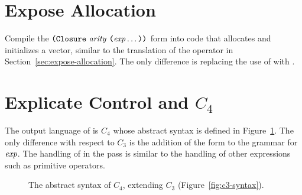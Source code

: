 \documentclass[11pt]{book}
\newcommand{\gray}[1]{{\color{gray} #1}}
\begin{document}
\section{Expose Allocation}
\label{sec:expose-allocation-r5}

Compile the $\texttt{(}\texttt{Closure}~\mathit{arity}~\texttt{(}\mathit{exp}\ldots\texttt{)}\texttt{)}$ form into code
that allocates and initializes a vector, similar to the translation of
the  operator in Section~\ref{sec:expose-allocation}.
The only difference is replacing the use of
 with
.


\section{Explicate Control and $C_4$}
\label{sec:explicate-r5}

The output language of  is $C_4$ whose
abstract syntax is defined in Figure~\ref{fig:c4-syntax}.  The only
difference with respect to $C_3$ is the addition of the
 form to the grammar for $\mathit{exp}$.  The handling
of  in the  pass is
similar to the handling of other expressions such as primitive
operators.

\begin{figure}[tp]
\fbox{
\begin{minipage}{0.96\textwidth}
\small
\[
\begin{array}{lcl}
\Exp &::= & \ldots
   \mid \ALLOCCLOS{\Int}{\Type}{\Int} \\
\Stmt &::=& \gray{ \ASSIGN{\VAR{\Var}}{\Exp} 
       \mid \LP\key{Collect} \,\itm{int}\RP } \\
\Tail &::= & \gray{ \RETURN{\Exp} \mid \SEQ{\Stmt}{\Tail} 
       \mid \GOTO{\itm{label}} } \\
    &\mid& \gray{ \IFSTMT{\BINOP{\itm{cmp}}{\Atm}{\Atm}}{\GOTO{\itm{label}}}{\GOTO{\itm{label}}}  }\\
    &\mid& \gray{ \TAILCALL{\Atm}{\Atm\ldots} } \\
\Def &::=& \gray{ \DEF{\itm{label}}{\LP[\Var\key{:}\Type]\ldots\RP}{\Type}{\itm{info}}{\LP\LP\itm{label}\,\key{.}\,\Tail\RP\ldots\RP} }\\
C_4 & ::= & \gray{ \PROGRAMDEFS{\itm{info}}{\LP\Def\ldots\RP} }
\end{array}
\]
\end{minipage}
}
\caption{The abstract syntax of $C_4$, extending $C_3$ (Figure~\ref{fig:c3-syntax}).}
\label{fig:c4-syntax}
\end{figure}
\end{document}
